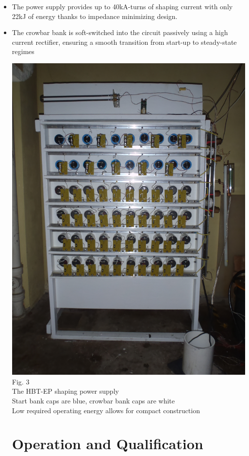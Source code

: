 \documentclass{article}
\begin{document}
\begin{multicols}{5}
\begin{itemize}
\item The power supply provides up to 40kA-turns of shaping current with only 22kJ of energy thanks to impedance minimizing design.
\item The crowbar bank is soft-switched into the circuit passively using a high current rectifier, ensuring a smooth transition from start-up to steady-state regimes\\
\vspace{.25in}
\begin{center}
\includegraphics[width=0.9\columnwidth]{Cap_bank.jpg}\\
Fig. 3\\
The HBT-EP shaping power supply\\
Start bank caps are blue, crowbar bank caps are white\\
Low required operating energy allows for compact construction\\
\vspace{.25in}
\end{center}
\section{Operation and Qualification}

\end{itemize}
\end{multicols}
\end{document}

